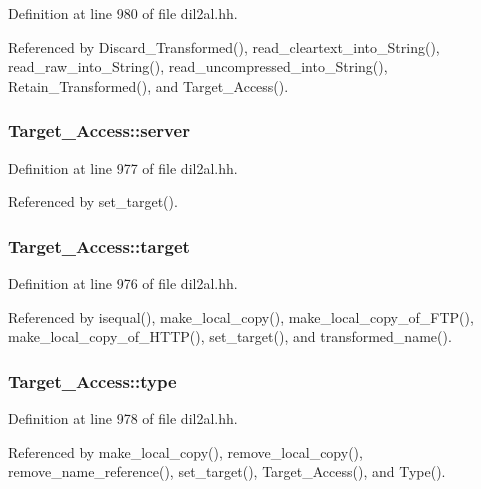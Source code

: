 Definition at line 980 of file dil2al.hh.

Referenced by Discard\_\-Transformed(), read\_\-cleartext\_\-into\_\-String(), read\_\-raw\_\-into\_\-String(), read\_\-uncompressed\_\-into\_\-String(), Retain\_\-Transformed(), and Target\_\-Access().
\subsubsection{ Target\_\-Access::server\hspace{0.3cm}{\tt  [protected]}}\label{classTarget__Access_n2}




Definition at line 977 of file dil2al.hh.

Referenced by set\_\-target().
\subsubsection{ Target\_\-Access::target\hspace{0.3cm}{\tt  [protected]}}\label{classTarget__Access_n0}




Definition at line 976 of file dil2al.hh.

Referenced by isequal(), make\_\-local\_\-copy(), make\_\-local\_\-copy\_\-of\_\-FTP(), make\_\-local\_\-copy\_\-of\_\-HTTP(), set\_\-target(), and transformed\_\-name().
\subsubsection{ Target\_\-Access::type\hspace{0.3cm}{\tt  [protected]}}\label{classTarget__Access_n4}




Definition at line 978 of file dil2al.hh.

Referenced by make\_\-local\_\-copy(), remove\_\-local\_\-copy(), remove\_\-name\_\-reference(), set\_\-target(), Target\_\-Access(), and Type().
